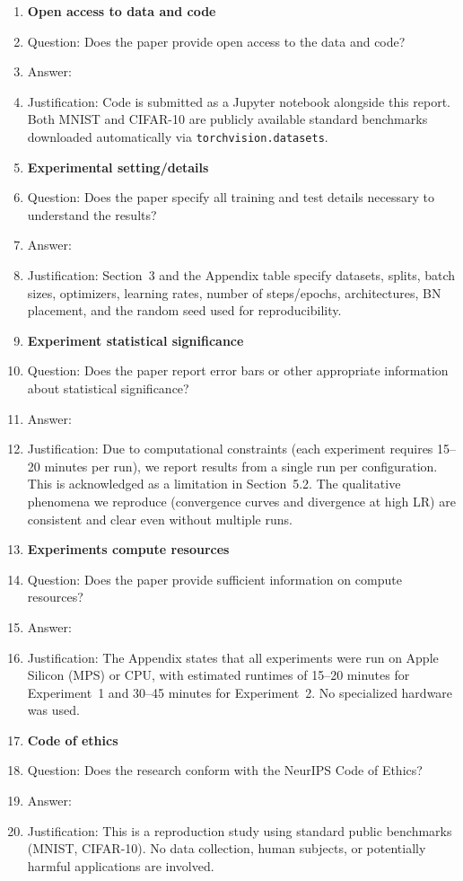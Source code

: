 \documentclass{article}
\begin{document}
\begin{enumerate}
\item \textbf{Open access to data and code}
  \item[] Question: Does the paper provide open access to the data and code?
  \item[] Answer: \answerYes{}
  \item[] Justification: Code is submitted as a Jupyter notebook alongside this report. Both
  MNIST and CIFAR-10 are publicly available standard benchmarks downloaded automatically via
  \texttt{torchvision.datasets}.

\item \textbf{Experimental setting/details}
  \item[] Question: Does the paper specify all training and test details necessary to
  understand the results?
  \item[] Answer: \answerYes{}
  \item[] Justification: Section~3 and the Appendix table specify datasets, splits, batch
  sizes, optimizers, learning rates, number of steps/epochs, architectures, BN placement,
  and the random seed used for reproducibility.

\item \textbf{Experiment statistical significance}
  \item[] Question: Does the paper report error bars or other appropriate information about
  statistical significance?
  \item[] Answer: \answerNo{}
  \item[] Justification: Due to computational constraints (each experiment requires 15--20
  minutes per run), we report results from a single run per configuration. This is acknowledged
  as a limitation in Section~5.2. The qualitative phenomena we reproduce (convergence curves
  and divergence at high LR) are consistent and clear even without multiple runs.

\item \textbf{Experiments compute resources}
  \item[] Question: Does the paper provide sufficient information on compute resources?
  \item[] Answer: \answerYes{}
  \item[] Justification: The Appendix states that all experiments were run on Apple Silicon
  (MPS) or CPU, with estimated runtimes of 15--20 minutes for Experiment~1 and 30--45 minutes
  for Experiment~2. No specialized hardware was used.

\item \textbf{Code of ethics}
  \item[] Question: Does the research conform with the NeurIPS Code of Ethics?
  \item[] Answer: \answerYes{}
  \item[] Justification: This is a reproduction study using standard public benchmarks (MNIST,
  CIFAR-10). No data collection, human subjects, or potentially harmful applications are
  involved.


\end{enumerate}
\end{document}
